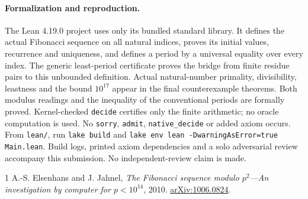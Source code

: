 \documentclass[11pt]{article}
\begin{document}
\paragraph{Formalization and reproduction.}
The Lean 4.19.0 project uses only its bundled standard library.
It defines the actual Fibonacci sequence on all natural indices,
proves its initial values, recurrence and uniqueness, and defines
a period by a universal equality over every index.
The generic least-period certificate proves the bridge from
finite residue pairs to this unbounded definition.
Actual natural-number primality, divisibility, leastness and the
bound $10^{17}$ appear in the final counterexample theorems.
Both modulus readings and the inequality of the conventional
periods are formally proved. Kernel-checked \texttt{decide}
certifies only the finite arithmetic; no oracle computation is used.
No \texttt{sorry}, \texttt{admit}, \texttt{native\_decide} or added
axiom occurs. From \texttt{lean/}, run
\texttt{lake build} and
\texttt{lake env lean -DwarningAsError=true Main.lean}.
Build logs, printed axiom dependencies and a solo adversarial
review accompany this submission. No independent-review claim is made.

\begin{thebibliography}{1}
 A.-S. Elsenhans and J. Jahnel,
\emph{The Fibonacci sequence modulo $p^2$---An investigation by
computer for $p<10^{14}$}, 2010.
\href{https://arxiv.org/abs/1006.0824}{arXiv:1006.0824}.
\end{thebibliography}
\end{document}
